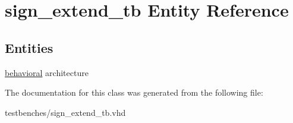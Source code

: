 \hypertarget{classsign__extend__tb}{\section{sign\-\_\-extend\-\_\-tb \-Entity \-Reference}
\label{classsign__extend__tb}
}
\subsection*{\-Entities}
\begin{DoxyCompactItemize}
\item 
\hyperlink{classsign__extend__tb_1_1behavioral}{behavioral} architecture
\end{DoxyCompactItemize}


\-The documentation for this class was generated from the following file\-:\begin{DoxyCompactItemize}
\item 
testbenches/sign\-\_\-extend\-\_\-tb.\-vhd\end{DoxyCompactItemize}
